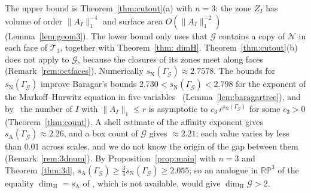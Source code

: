 \documentclass[11pt]{amsart}
\theoremstyle{definition}
\theoremstyle{remark}
\newcommand{\RP}{\mathbb{RP}}
\newcommand{\cN}{\mathcal N}
\newcommand{\cT}{\mathcal T}
\newcommand{\cG}{\mathcal G}
\newcommand{\GG}{\Gamma_{\mathcal G}}
\newcommand{\sN}{s_{\mathrm N}}
\newcommand{\sA}{s_{\mathrm A}}
\newcommand{\dimH}{\dim_{\mathrm H}}
\newcommand{\norm}[1]{\lVert #1\rVert}
\begin{document}
The upper bound is Theorem~\ref{thm:cutout}(a) with $n=3$: the zone $Z_I$ has volume of order $\|A_I\|_1^{-4}$ and surface area $O(\|A_I\|_1^{-2})$ (Lemma~\ref{lem:geom3}). The lower bound only uses that $\cG$ contains a copy of $\cN$ in each face of $\cT_3$, together with Theorem~\ref{thm: dimH}. Theorem~\ref{thm:cutout}(b) does not apply to $\cG$, because the closures of its zones meet along faces (Remark~\ref{rem:octfaces}).
Numerically $\sN(\GG)\approx2.7578$. The bounds for $\sN(\GG)$ improve Baragar's bounds $2.730<\sN(\GG)<2.798$ for the exponent of the Markoff--Hurwitz equation in five variables~\cite[Thm.~0.1]{Bar98} (Lemma~\ref{lem:baragartree}), and by~\cite[Thm.~13]{GMR19} the number of $I$ with $\norm{A_I}_1\le r$ is asymptotic to $c_3\,r^{\sN(\GG)}$ for some $c_3>0$ (Theorem~\ref{thm:count}). A shell estimate of the affinity exponent gives $\sA(\GG)\approx2.26$, and a box count of $\cG$ gives $\approx2.21$; each value varies by less than $0.01$ across scales, and we do not know the origin of the gap between them (Remark~\ref{rem:3dnum}). By Proposition~\ref{prop:main} with $n=3$ and Theorem~\ref{thm:3d}, $\sA(\GG)\ge\frac34\sN(\GG)\ge2.055$; so an analogue in $\RP^3$ of the equality $\dimH=\sA$ of \cite{JLPX23,Jur26}, which is not available, would give $\dimH\cG>2$.

\medskip
\end{document}
